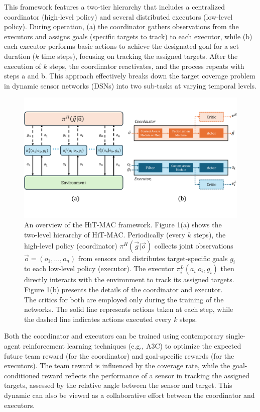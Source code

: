 \documentclass[preprint,12pt]{elsarticle}
\begin{document}
This framework features a two-tier hierarchy that includes a centralized coordinator (high-level policy) and several distributed executors (low-level policy). During operation, (a) the coordinator gathers observations from the executors and assigns goals (specific targets to track) to each executor, while (b) each executor performs basic actions to achieve the designated goal for a set duration ($k$ time steps), focusing on tracking the assigned targets. After the execution of $k$ steps, the coordinator reactivates, and the process repeats with steps a and b. This approach effectively breaks down the target coverage problem in dynamic sensor networks (DSNs) into two sub-tasks at varying temporal levels.
\begin{figure}[h]
    \centering
    \includegraphics[width=\linewidth]{graphics/MoE.png}
    \caption{An overview of the HiT-MAC framework. 
    Figure 1(a) shows the two-level hierarchy of HiT-MAC. Periodically (every $k$ steps), the high-level policy (coordinator) $\pi^H(\overset{\rightarrow}{g}| \overset{\rightarrow}{o})$ collects joint observations $\overset{\rightarrow}{o} = (o_1, \dots, o_n)$ from sensors and distributes target-specific goals $g_i$ to each low-level policy (executor). The executor $\pi_i^L(a_i| o_i, g_i)$ then directly interacts with the environment to track its assigned targets. Figure 1(b) presents the details of the coordinator and executor. The critics for both are employed only during the training of the networks. The solid line represents actions taken at each step, while the dashed line indicates actions executed every $k$ steps.}
    \label{fig:hs-flowchart}
    
\end{figure}

Both the coordinator and executors can be trained using contemporary single-agent reinforcement learning techniques (e.g., A3C) to optimize the expected future team reward (for the coordinator) and goal-specific rewards (for the executors). The team reward is influenced by the coverage rate, while the goal-conditioned reward reflects the performance of a sensor in tracking the assigned targets, assessed by the relative angle between the sensor and target. This dynamic can also be viewed as a collaborative effort between the coordinator and executors.
\end{document}
